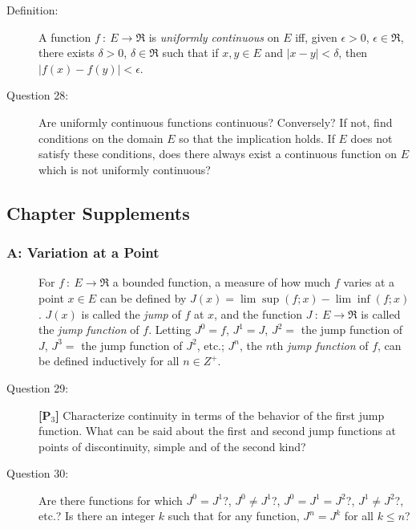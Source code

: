 \documentclass{article}
\begin{document}
\begin{description}
  \item[Definition:] A function $f\ :\ E \to \Re$ is \emph{uniformly continuous} on $E$ iff, given $\epsilon > 0$, $\epsilon \in \Re$, there exists $\delta > 0$, $\delta \in \Re$ such that if $x,y \in E$ and $|x-y| < \delta$, then $|f(x) - f(y)| < \epsilon$.

  \item[Question 28:] Are uniformly continuous functions continuous? Conversely? If not, find conditions on the domain $E$ so that the implication holds. If $E$ does not satisfy these conditions, does there always exist a continuous function on $E$ which is not uniformly continuous?

\end{description}


\subsection*{Chapter Supplements}


\subsubsection*{A: Variation at a Point}

\begin{description}

  \item[] For $f\ :\ E \to \Re$ a bounded function, a measure of how much $f$ varies at a point $x \in E$ can be defined by $J(x) = \lim \sup (f;x) - \lim \inf (f;x)$. $J(x)$ is called the \emph{jump} of $f$ at $x$, and the function $J\ :\ E \to \Re$ is called the \emph{jump function} of $f$. Letting $J^0 = f$, $J^1 = J$, $J^2 =$ the jump function of $J$, $J^3 =$ the jump function of $J^2$, etc.; $J^n$, the $n$th \emph{jump function} of $f$, can be defined inductively for all $n \in Z^+$.

  \item[Question 29:] \textbf{[P$_3$]} Characterize continuity in terms of the behavior of the first jump function. What can be said about the first and second jump functions at points of discontinuity, simple and of the second kind?

  \item[Question 30:] Are there functions for which $J^0 = J^1$?, $J^0 \neq J^1$?, $J^0 = J^1 = J^2$?, $J^1 \neq J^2$?, etc.? Is there an integer $k$ such that for any function, $J^n = J^k$ for all $k \leq n$?

\end{description}
\end{document}
